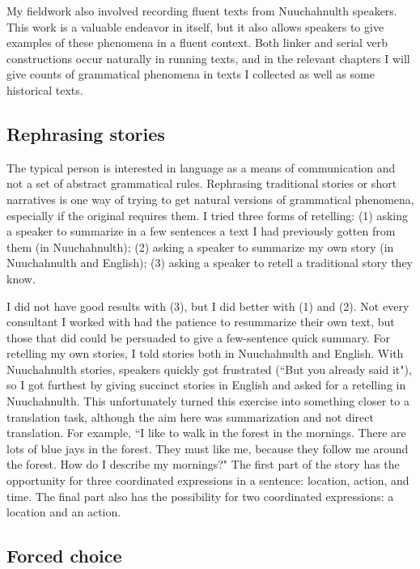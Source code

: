 My fieldwork also involved recording fluent texts from Nuuchahnulth speakers. This work is a valuable endeavor in itself, but it also allows speakers to give examples of these phenomena in a fluent context. Both linker and serial verb constructions occur naturally in running texts, and in the relevant chapters I will give counts of grammatical phenomena in texts I collected as well as some historical texts.

\subsection{Rephrasing stories}

The typical person is interested in language as a means of communication and not a set of abstract grammatical rules. Rephrasing traditional stories or short narratives is one way of trying to get natural versions of grammatical phenomena, especially if the original requires them. I tried three forms of retelling: (1) asking a speaker to summarize in a few sentences a text I had previously gotten from them (in Nuuchahnulth); (2) asking a speaker to summarize my own story (in Nuuchahnulth and English); (3) asking a speaker to retell a traditional story they know.

I did not have good results with (3), but I did better with (1) and (2). Not every consultant I worked with had the patience to resummarize their own text, but those that did could be persuaded to give a few-sentence quick summary. For retelling my own stories, I told stories both in Nuuchahnulth and English. With Nuuchahnulth stories, speakers quickly got frustrated (``But you already said it"), so I got furthest by giving succinct stories in English and asked for a retelling in Nuuchahnulth. This unfortunately turned this exercise into something closer to a translation task, although the aim here was summarization and not direct translation. For example, ``I like to walk in the forest in the mornings. There are lots of blue jays in the forest. They must like me, because they follow me around the forest. How do I describe my mornings?" The first part of the story has the opportunity for three coordinated expressions in a sentence: location, action, and time. The final part also has the possibility for two coordinated expressions: a location and an action. 

\subsection{Forced choice}

